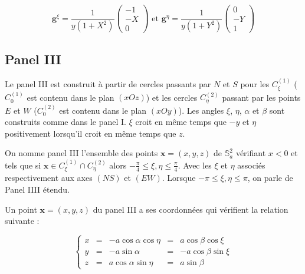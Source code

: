 \begin{equation}
\mathbf{g}^{\xi} = \dfrac{1}{y(1+X^2)}\begin{pmatrix}
-1 \\ -X \\ 0
\end{pmatrix} \text{ et } \mathbf{g}^{\eta} = \dfrac{1}{y(1+Y^2)}\begin{pmatrix}
0 \\ -Y \\ 1
\end{pmatrix}
\label{eq: base duale II}
\end{equation}














\subsection{Panel III}

Le panel III est construit à partir de cercles passants par $N$ et $S$ pour les $C_{\xi}^{(1)}$ ($C_{0}^{(1)}$ est contenu dans le plan $(xOz)$) et les cercles $C_{\eta}^{(2)}$ passant par les points $E$ et $W$ ($C_{0}^{(2)}$ est contenu dans le plan $(xOy)$). Les angles $\xi$, $\eta$, $\alpha$ et $\beta$ sont construits comme dans le panel I. $\xi$ croit en même temps que $-y$ et $\eta$ positivement lorsqu'il croit en même temps que $z$.

\begin{definition}
On nomme panel III l'ensemble des points $\mathbf{x}=(x,y,z)$ de $\mathbb{S}_a^2$ vérifiant $x<0$ et tels que si $\mathbf{x} \in C_{\xi}^{(1)} \cap C_{\eta}^{(2)}$ alors $-\frac{\pi}{4}\leq \xi,\eta \leq \frac{\pi}{4}$. Avec les $\xi$ et $\eta$ associés respectivement aux axes $(NS)$ et $(EW)$. Lorsque $-\pi \leq \xi,\eta \leq \pi$, on parle de Panel IIII étendu.
\end{definition}

Un point $\mathbf{x}=(x,y,z)$ du panel III a ses coordonnées qui vérifient la relation suivante :

\begin{equation}
\left\lbrace
\begin{array}{rcccc}
x & = & - a \cos \alpha \cos \eta & = & a \cos \beta \cos \xi \\
y & = & - a \sin \alpha & = & - a \cos \beta \sin \xi \\
z & = & a \cos \alpha \sin \eta & = & a \sin \beta
\end{array}
\right.
\end{equation}

